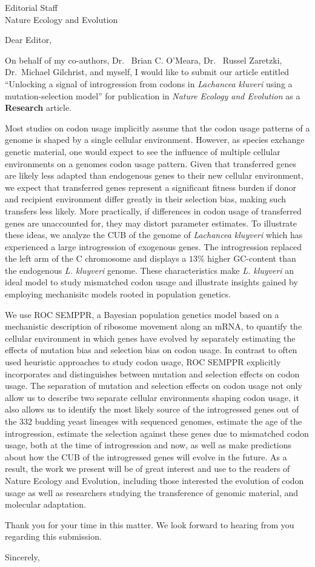 \documentclass[11pt, letterpaper]{letter}
\begin{document}
\begin{letter}{Editorial Staff\\Nature Ecology and Evolution}



\opening{Dear Editor,}

On behalf of my co-authors, Dr.~ Brian C. O'Meara, Dr.~ Russel Zaretzki, Dr.~Michael Gilchrist, and myself, I would like to submit our article entitled ``Unlocking a signal of introgression from codons in \textit{Lachancea kluveri} using a mutation-selection model'' for publication in \emph{Nature Ecology and Evolution} as a \textbf{Research} article. 

Most studies on codon usage implicitly assume that the codon usage patterns of a genome is shaped by a single cellular environment. 
However, as species exchange genetic material, one would expect to see the influence of multiple cellular environments on a genomes codon usage pattern.
Given that transferred genes are likely less adapted than endogenous genes to their new cellular environment, we expect that transferred genes represent a significant fitness burden if donor and recipient environment differ greatly in their selection bias, making such transfers less likely.
More practically, if differences in codon usage of transferred genes are unaccounted for, they may distort parameter estimates.
To illustrate these ideas, we analyze the CUB of the genome of \emph{Lachancea kluyveri} which has experienced a large introgression of exogenous genes.
The introgression replaced the left arm of the C chromosome and displays a $13 \%$ higher GC-content than the endogenous \emph{L. kluyveri} genome.
These characteristics make \emph{L. kluyveri} an ideal model to study mismatched codon usage and illustrate insights gained by employing mechanisitc models rooted in population genetics.

We use ROC SEMPPR, a Bayesian population genetics model based on a mechanistic description of ribosome movement along an mRNA, to quantify the cellular environment in which genes have evolved by separately estimating the effects of mutation bias and selection bias on codon usage.
In contrast to often used heuristic approaches to study codon usage, ROC SEMPPR explicitly incorporates and distinguishes between mutation and selection effects on codon usage.
The separation of mutation and selection effects on codon usage not only allow us to describe two separate cellular environments shaping codon usage, it also allows us to identify the most likely source of the introgressed genes out of the 332 budding yeast lineages with sequenced genomes, estimate the age of the introgression, estimate the selection against these genes due to mismatched codon usage, both at the time of introgression and now, as well as make predictions about how the CUB of the introgressed genes will evolve in the future.
As a result, the work we present will be of great interest and use to the readers of Nature Ecology and Evolution, including those interested the evolution of codon usage as well as researchers studying the transference of genomic material, and molecular adaptation.

Thank you for your time in this matter.
We look forward to hearing from you regarding this submission.

\closing{Sincerely,}

\end{letter}
\end{document}
